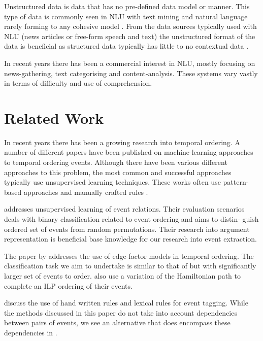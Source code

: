 \documentclass[bsc,frontabs,twoside,singlespacing,parskip,deptreport]{infthesis}     %
\begin{document}
Unstructured data is data that has no pre-defined data model or manner. This type of data is
commonly seen in NLU with text mining and natural language rarely forming to any cohesive model \cite{feldman2007text}.
From the data sources typically used with NLU (news articles or free-form speech and text) the unstructured format of
the data is beneficial as structured data typically has little to no contextual data \cite{feldman2007text}.

In recent years there has been a commercial interest in NLU, mostly focusing on news-gathering, text categorising and
content-analysis. These systems vary vastly in terms of difficulty and use of comprehension. 


\section{Related Work}
In recent years there has been a growing research into temporal ordering.
A number of different papers have been published on machine-learning approaches to temporal ordering events.
Although there have been various different approaches to this problem, the most common and successful approaches typically
use unsupervised learning techniques. These works often use pattern-based approaches and manually crafted rules \cite{chklovski2004mining}.  

\cite{chambers2009unsupervised}addresses unsupervised learning of event relations. Their evaluation
scenarios deals with binary classification related to event ordering and aims to distin-
guish ordered set of events from random permutations. Their research into argument representation is beneficial base
knowledge for our research into event extraction.

The paper by \cite{abend2015lexical} addresses the use of
edge-factor models in temporal ordering. The classification task we aim to undertake is similar to that of \cite{abend2015lexical}
but with significantly larger set of events to order. \cite{abend2015lexical} also use a variation of the Hamiltonian path
to complete an ILP ordering of their events.

\cite{mani2006machine} discuss the use of hand written rules and lexical rules for event tagging. While the methods discussed in this paper
do not take into account dependencies between pairs of events, we see an alternative that does encompass
these dependencies in \cite{schapire1998learning}.  

\end{document}
